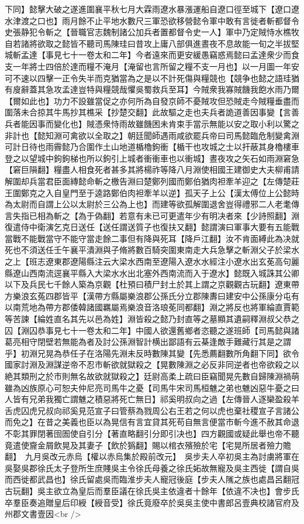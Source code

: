 下同】懿擊大破之遂進圍襄平秋七月大霖雨遼水暴漲運船自遼口徑至城下【遼口遼水津渡之口也】雨月餘不止平地水數尺三軍恐欲移營懿令軍中敢有言徙者斬都督令史張静犯令斬之【晉職官志魏制諸公加兵者置都督令史一人】軍中乃定賊恃水樵牧自若諸將欲取之懿皆不聽司馬陳珪曰昔攻上庸八部俱進晝夜不息故能一旬之半拔堅城斬孟達【事見七十一卷太和二年】今者遠來而更安緩愚竊惑焉懿曰孟達衆少而食支一年將士四倍於達而糧不淹月【淹留也言所留之糧不支一月也】以一月圖一年安可不速以四擊一正令失半而克猶當為之是以不計死傷與糧競也【競争也懿之語珪猶有廋辭蓋其急攻孟達豈特與糧競哉懼吳蜀救兵至耳】今賊衆我寡賊饑我飽水雨乃爾【爾如此也】功力不設雖當促之亦何所為自發京師不憂賊攻但恐賊走今賊糧垂盡而圍落未合掠其牛馬抄其樵采【抄楚交翻】此故驅之走也夫兵者詭道善因事變【言善兵者能因事而變化也】賊憑衆恃雨故雖饑困未肯束手當示無能以安之取小利以驚之非計也【懿知淵可禽欲以全取之】朝廷聞師遇雨咸欲罷兵帝曰司馬懿臨危制變禽淵可計日待也雨霽懿乃合圍作土山地道楯櫓鉤衝【楯干也攻城之士以扞蔽其身櫓樓車登之以望城中鉤鉤梯也所以鉤引上城者衝衝車也以衝城】晝夜攻之矢石如雨淵窘急【窘巨隕翻】糧盡人相食死者甚多其將楊祚等降八月淵使相國王建御史大夫柳甫請解圍却兵當君臣面縳懿命斬之檄告淵曰楚鄭列國而鄭伯猶肉袒牽羊迎之【左傳楚莊王圍鄭克之入自皇門至于逵路鄭伯肉袒牽羊以逆】孤天子上公【漢太傅位上公懿時為太尉而自謂上公以太尉於三公為上也】而建等欲孤解圍退舍豈得禮邪二人老耄傳言失指已相為斬之【為于偽翻】若意有未已可更遣年少有明决者來【少詩照翻】淵復遣侍中衛演乞克日送任【送任謂送質子也復扶又翻】懿謂演曰軍事大要有五能戰當戰不能戰當守不能守當走餘二事但有降與死耳【降戶江翻】汝不肯面縛此為决就死也不須送任壬午襄平潰淵與子脩將數百騎突圍東南走大兵急擊之斬淵父子於梁水之上【班志遼東郡遼陽縣注云大梁水西南至遼陽入遼水水經注小遼水出玄莬高句麗縣遼山西南流逕襄平縣入大梁水水出北塞外西南流而入于遼水】懿既入城誅其公卿以下及兵民七千餘人築為京觀【杜預曰積尸封土於其上謂之京觀觀古玩翻】遼東帶方樂浪玄菟四郡皆平【漢帶方縣屬樂浪郡公孫氏分立郡陳夀曰建安中公孫康分屯有以南荒地為帶方郡倭韓諸國羈屬焉樂浪音洛琅莬同都翻】淵之將反也將軍綸直賈範等苦諫【綸姓直名其先以邑為姓】淵皆殺之懿乃封直等之墓顯其遺嗣釋淵叔父恭之囚【淵囚恭事見七十一卷太和二年】中國人欲還舊鄉者恣聽之遂班師【司馬懿與諸葛亮相守閉壁若無能為者及討公孫淵智計横出鄙語有云棊逢敵手難藏行其是之謂乎】初淵兄晃為恭任子在洛陽先淵未反時數陳其變【先悉薦翻數所角翻下同】欲令國家討淵及淵謀逆帝不忍市斬欲就獄殺之【晃數陳淵之必反非同逆者也帝欲殺之以絶其類刑之於市則無名故欲就獄殺之】廷尉高柔上疏曰臣竊聞晃先數自歸陳淵禍萌雖為凶族原心可恕夫仲尼亮司馬牛之憂【司馬牛宋司馬桓魋之弟也魋凶惡牛憂之曰人皆有兄弟我獨亡謂魋之積惡將死亡無日】祁奚明叔向之過【左傳晉人逐欒盈殺羊舌虎囚虎兄叔向祁奚見范宣子曰管蔡為戮周公右王若之何以虎也棄社稷宣子言諸公而免之】在昔之美義也臣以為晃信有言宜貸其死苟自無言便當市斬今進不赦其命退不彰其罪閉著囹圄使自引分【著直略翻引分即引决也】四方觀國或疑此舉也帝不聽竟遣使齎金屑飲晃及其妻子【飲於㺔翻】賜以棺衣殯殮於宅【宅晃所居者殮力贍翻】　九月吳改元赤烏【權以赤烏集於殿前改元】　吳步夫人卒初吳主為討虜將軍在吳娶吳郡徐氏太子登所生庶賤吳主令徐氏母養之徐氏妬故無寵及吳主西徙【謂自吳而西徙都武昌也】徐氏留處吳而臨淮步夫人寵冠後庭【步夫人隲之族也處昌呂翻冠古玩翻】吳主欲立為皇后而羣臣議在徐氏吳主依違者十餘年【依違不决也】會步氏卒羣臣奏追贈皇后印綬【綬音受】徐氏竟廢卒於吳吳主使中書郎呂壹典校諸官府及州郡文書壹因<br />

